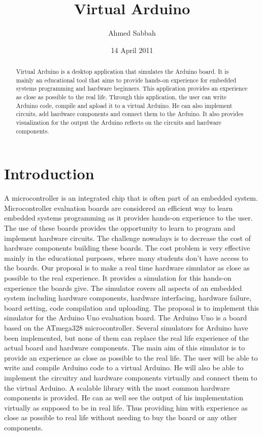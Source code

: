 \documentclass[12pt, a4paper]{report}
\title{Virtual Arduino}
\author{Ahmed Sabbah}
\date{14 April 2011}
\begin{document}
\maketitle
\begin{abstract}
Virtual Arduino is a desktop application that simulates the Arduino board. It is mainly an educational tool that aims to provide hands-on experience for embedded systems programming and hardware beginners. This application provides an experience as close as possible to the real life. Through this application, the user can write Arduino code, compile and apload it to a virtual Arduino. He can also implement circuits, add hardware components and connect them to the Arduino. It also provides visualization for the output the Arduino reflects on the circuits and hardware components.
\end{abstract}


\chapter{Introduction}
A microcontroller is an integrated chip that is often part of an embedded system. Microcontroller evaluation boards are considered an efficient way to learn embedded systems programming as it provides hands-on experience to the user. The use of these boards provides the opportunity to learn to program and implement hardware circuits. The challenge nowadays is to decrease the cost of hardware components building these boards. The cost problem is very effective mainly in the educational purposes, where many students don’t have access to the boards. Our proposal is to make a real time hardware simulator as close as possible to the real experience. It provides a simulation for this hands-on experience the boards give. The simulator covers all aspects of an embedded system including hardware components, hardware interfacing, hardware failure, board setting, code compilation and uploading. The proposal is to implement this simulator for the Arduino Uno evaluation board. The Arduino Uno is a board based on the ATmega328 microcontroller. Several simulators for Arduino have been implemented, but none of them can replace the real life experience of the actual board and hardware components. The main aim of this simulator is to provide an experience as close as possible to the real life. The user will be able to write and compile Arduino code to a virtual Arduino. He will also be able to implement the circuitry and hardware components virtually and connect them to the virtual Arduino. A scalable library with the most common hardware components is provided. He can as well see the output of his implementation virtually as supposed to be in real life. Thus providing him with experience as close as possible to real life without needing to buy the board or any other components.
\end{document}
